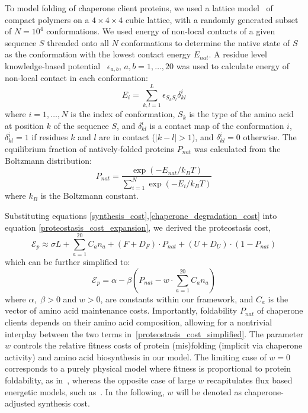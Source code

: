 \documentclass[10pt,letterpaper]{article}
\begin{document}
To model folding of chaperone client proteins, we used a lattice model~\cite{Shakhnovich1990Enumeration,Sikosek2014Biophysics} of compact polymers on a $4\times4\times4$ cubic lattice, with a randomly generated subset of $N=10^{4}$ conformations. We used energy of non-local contacts of a given sequence $S$ threaded onto all $N$ conformations to determine the native state of $S$ as the conformation with the lowest contact energy $E_{nat}$. A residue level knowledge-based potential~\cite{Miyazawa1999SelfConsistent} $\epsilon_{a,b},\, a,b=1,\dots,20$ was used to calculate energy of non-local contact in each conformation:
\begin{equation}
	\label{protein_globule_energy}
	E_{i} = \sum\limits_{k,l=1}^{L}\epsilon_{S_{k}S_{l}}\delta^{i}_{kl}
\end{equation}
where $i=1,\dots,N$ is the index of conformation, $S_{k}$ is the type of the amino acid at position $k$ of the sequence $S$, and $\delta^{i}_{kl}$ is a contact map of the conformation $i$, $\delta^{i}_{kl}=1$ if residues $k$ and $l$ are in contact ($|k-l|>1$), and $\delta^{i}_{kl}=0$ otherwise. The equilibrium fraction of natively-folded proteins $P_{nat}$ was calculated from the Boltzmann distribution:
\begin{equation}
	\label{pnat_boltzmann}
	P_{nat} = \frac{\exp\left(-E_{nat}/k_{B}T\right)}{\sum\limits_{i=1}^{N}\exp\left(-E_{i}/k_{B}T\right)}
\end{equation}
where $k_{B}$ is the Boltzmann constant. 


Substituting equations \eqref{synthesis_cost},\eqref{chaperone_degradation_cost} into equation \eqref{proteostasis_cost_expansion}, we derived the proteostasis cost, 
\begin{equation}
	\label{proteostasis_cost_detailed}
	\mathcal{E}_{p} \approx \sigma L + \sum\limits_{a=1}^{20}C_{a}n_{a} + (F+D_{F})\cdot P_{nat} + (U+D_{U})\cdot\left(1-P_{nat}\right)
\end{equation}
which can be further simplified to:
\begin{equation}
	\label{proteostasis_cost_simplified}
	\mathcal{E}_{p} = \alpha - \beta\left(P_{nat} - w\cdot\sum\limits_{a=1}^{20}C_{a}n_{a} \right)
\end{equation}
where $\alpha$,\, $\beta > 0$ and $w>0$, are constants within our framework, and $C_{a}$ is the vector of amino acid maintenance costs. Importantly, foldability $P_{nat}$ of chaperone clients depends on their amino acid composition, allowing for a nontrivial interplay between the two terms in~\eqref{proteostasis_cost_simplified}. The parameter $w$ controls the relative fitness costs of protein (mis)folding (implicit via chaperone activity) and amino acid biosynthesis in our model. The limiting case of $w=0$ corresponds to a purely physical model where fitness is proportional to protein foldability, as in~\cite{Taverna2002Why,Bloom2006Protein,Zeldovich2007First,Lobkovsky2010Universal}, whereas the opposite case of large $w$ recapitulates flux based energetic models, such as~\cite{Akashi2002Metabolic,Krick2014Amino,Kepp2014Model}. In the following, $w$ will be denoted as chaperone-adjusted synthesis cost.
 
\end{document}

